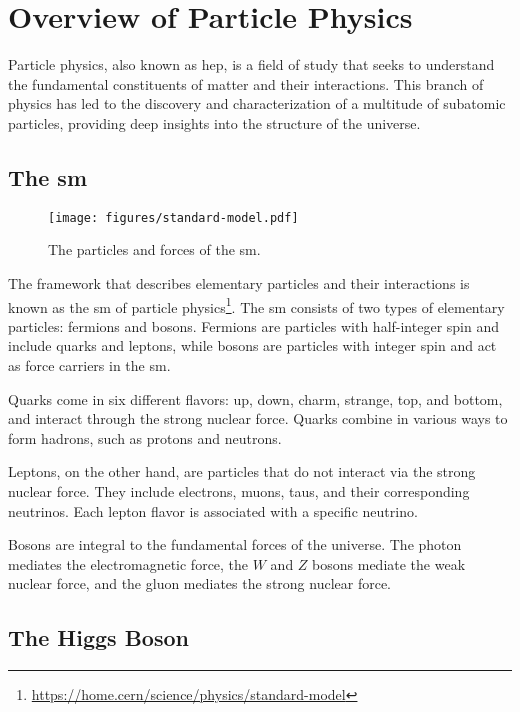 \section{Overview of Particle Physics}

Particle physics, also known as \gls{hep}, is a field of study that seeks to understand the fundamental
constituents of matter and their interactions. This branch of physics has led to the discovery and characterization of a
multitude of subatomic particles, providing deep insights into the structure of the universe.

\subsection{The \gls{sm}}

\begin{figure}[htb]
    \centering
    \texttt{[image: figures/standard-model.pdf]}
    \caption{The particles and forces of the \gls{sm}.}
    \label{fig:standard-model}
\end{figure}

The framework that describes elementary particles and their interactions is known as the \gls{sm} of particle
physics\footnote{\url{https://home.cern/science/physics/standard-model}}. The \gls{sm} consists of two types of elementary particles: fermions and bosons. Fermions are particles with
half-integer spin and include quarks and leptons, while bosons are particles with integer spin and act as force carriers
in the \gls{sm}.

Quarks come in six different flavors: up, down, charm, strange, top, and bottom, and interact
through the strong nuclear force. Quarks combine in various ways to form hadrons, such as protons and neutrons.

Leptons, on the other hand, are particles that do not interact via the strong nuclear force. They include electrons,
muons, taus, and their corresponding neutrinos. Each lepton flavor is associated with a specific neutrino.

Bosons are integral to the fundamental forces of the universe. The photon mediates the electromagnetic force, the $W$
and $Z$ bosons mediate the weak nuclear force, and the gluon mediates the strong nuclear force.

\subsection{The Higgs Boson}

